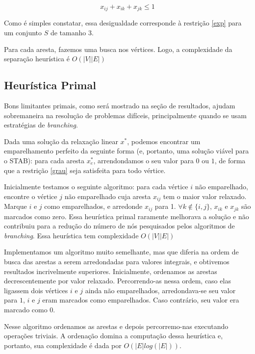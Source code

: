 \documentclass[11pt]{article}
\begin{document}
\begin{equation}
 x_{ij} + x_{ik} + x_{jk} \leq 1
\end{equation}

Como é simples constatar, essa desigualdade corresponde à restrição
\eqref{exp} para um conjunto $S$ de tamanho $3$. 

Para cada aresta, fazemos uma busca nos vértices. Logo, a complexidade
da separação heurística é $O(|V||E|)$

\subsection{Heurística Primal}

Bons limitantes primais, como será mostrado na seção de resultados,
ajudam sobremaneira na resolução de problemas difíceis, principalmente
quando se usam estratégias de \emph{branching}.

Dada uma solução da relaxação linear $x^*$, podemos encontrar um
emparelhamento perfeito da seguinte forma (e, portanto, uma solução
viável para o STAB): para cada aresta $x^*_e$, arrendondamos o seu valor
para $0$ ou $1$, de forma que a restrição \eqref{grau} seja satisfeita
para todo vértice. 

Inicialmente testamos o seguinte algoritmo: para cada vértice $i$ não
emparelhado, encontre o vértice $j$ não emparelhado cuja aresta $x_{ij}$
tem o maior valor relaxado. Marque $i$ e $j$ como emparelhados, e
arredonde $x_{ij}$ para 1. $\forall k \notin \{i,j\}$, $x_{ik}$ e $x_{jk}$ são
marcados como zero. Essa heurística primal raramente melhorava a
solução e não contribuiu para a redução do número de nós pesquisados
pelos algoritmos de \emph{branching}. Essa heurística tem complexidade
$O(|V||E|)$ 

Implementamos um algoritmo muito semelhante, mas que diferia na ordem de
busca das arestas a serem arredondadas para valores integrais, e
obtivemos resultados incrivelmente superiores. Inicialmente, ordenamos
as arestas decrescentemente por valor relaxado. Percorrendo-as nessa
ordem, caso elas ligassem dois vértices $i$ e $j$ ainda não emparelhados,
arredondava-se seu valor para $1$, $i$ e $j$ eram marcados como
emparelhados. Caso contrário, seu valor era marcado como $0$. 

Nesse algoritmo ordenamos as arestas e depois percorremo-nas executando
operações triviais. A ordenação domina a computação dessa heurística e,
portanto, sua complexidade é dada por $O(|E| log (|E|))$.
\end{document}

